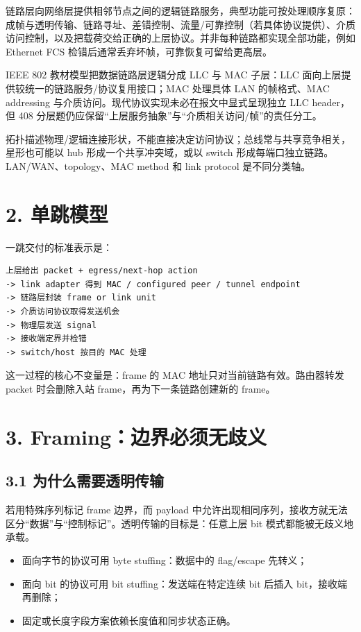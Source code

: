 \documentclass[UTF8,fontset=none,11pt,a4paper]{ctexart}
\providecommand{\tightlist}{\setlength{\itemsep}{0pt}\setlength{\parskip}{0pt}}
\begin{document}
链路层向网络层提供相邻节点之间的逻辑链路服务，典型功能可按处理顺序复原：成帧与透明传输、链路寻址、差错控制、流量/可靠控制（若具体协议提供）、介质访问控制，以及把载荷交给正确的上层协议。并非每种链路都实现全部功能，例如 Ethernet FCS 检错后通常丢弃坏帧，可靠恢复可留给更高层。

IEEE 802 教材模型把数据链路层逻辑分成 LLC 与 MAC 子层：LLC 面向上层提供较统一的链路服务/协议复用接口；MAC 处理具体 LAN 的帧格式、MAC addressing 与介质访问。现代协议实现未必在报文中显式呈现独立 LLC header，但 408 分层题仍应保留“上层服务抽象”与“介质相关访问/帧”的责任分工。

拓扑描述物理/逻辑连接形状，不能直接决定访问协议；总线常与共享竞争相关，星形也可能以 hub 形成一个共享冲突域，或以 switch 形成每端口独立链路。LAN/WAN、topology、MAC method 和 link protocol 是不同分类轴。

\section{2. 单跳模型}\label{2-ux5355ux8df3ux6a21ux578b}

一跳交付的标准表示是：

\begin{lstlisting}
上层给出 packet + egress/next-hop action
-> link adapter 得到 MAC / configured peer / tunnel endpoint
-> 链路层封装 frame or link unit
-> 介质访问协议取得发送机会
-> 物理层发送 signal
-> 接收端定界并检错
-> switch/host 按目的 MAC 处理
\end{lstlisting}

这一过程的核心不变量是：frame 的 MAC 地址只对当前链路有效。路由器转发
packet 时会删除入站 frame，再为下一条链路创建新的 frame。

\section{3.
Framing：边界必须无歧义}\label{3-framingux8fb9ux754cux5fc5ux987bux65e0ux6b67ux4e49}

\subsection{3.1
为什么需要透明传输}\label{31-ux4e3aux4ec0ux4e48ux9700ux8981ux900fux660eux4f20ux8f93}

若用特殊序列标记 frame 边界，而 payload
中允许出现相同序列，接收方就无法区分``数据''与``控制标记''。透明传输的目标是：任意上层
bit 模式都能被无歧义地承载。

\begin{itemize}
\tightlist
\item
  面向字节的协议可用 byte stuffing：数据中的 flag/escape 先转义；
\item
  面向 bit 的协议可用 bit stuffing：发送端在特定连续 bit 后插入
  bit，接收端再删除；
\item
  固定或长度字段方案依赖长度值和同步状态正确。
\end{itemize}
\end{document}
